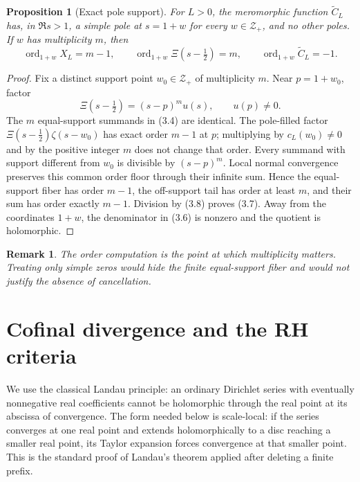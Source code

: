 \documentclass[11pt]{article}
\newtheorem{proposition}[theorem]{Proposition}
\newtheorem{remark}[theorem]{Remark}
\newcommand{\XiR}{\Xi}
\newcommand{\cZ}{\mathcal Z}
\newcommand{\ord}{\operatorname{ord}}
\begin{document}
\begin{proposition}[Exact pole support]\label{prop:poles}
For $L>0$, the meromorphic function $\widetilde C_L$ has, in $\Re s>1$, a simple pole at
$s=1+w$ for every $w\in\cZ_+$, and no other poles.  If $w$ has multiplicity $m$, then
\[
  \ord_{1+w}X_L=m-1,
  \qquad
  \ord_{1+w}\XiR(s-\tfrac12)=m,
  \qquad
  \ord_{1+w}\widetilde C_L=-1.
  \tag{3.7}
\]
\end{proposition}

\begin{proof}
Fix a distinct support point $w_0\in\cZ_+$ of multiplicity $m$.  Near $p=1+w_0$, factor
\[
  \XiR(s-\tfrac12)=(s-p)^m u(s),\qquad u(p)\ne0.
  \tag{3.8}
\]
The $m$ equal-support summands in (3.4) are identical.  The pole-filled factor
$\XiR(s-\frac12)\zeta(s-w_0)$ has exact order $m-1$ at $p$; multiplying by
$c_L(w_0)\ne0$ and by the positive integer $m$ does not change that order.  Every summand with
support different from $w_0$ is divisible by $(s-p)^m$.  Local normal convergence preserves this
common order floor through their infinite sum.  Hence the equal-support fiber has order $m-1$,
the off-support tail has order at least $m$, and their sum has order exactly $m-1$.  Division by
(3.8) proves (3.7).  Away from the coordinates $1+w$, the denominator in (3.6) is nonzero and the
quotient is holomorphic.
\end{proof}

\begin{remark}
The order computation is the point at which multiplicity matters.  Treating only simple zeros
would hide the finite equal-support fiber and would not justify the absence of cancellation.
\end{remark}

\section{Cofinal divergence and the RH criteria}

We use the classical Landau principle: an ordinary Dirichlet series with eventually nonnegative
real coefficients cannot be holomorphic through the real point at its abscissa of convergence.
The form needed below is scale-local: if the series converges at one real point and extends
holomorphically to a disc reaching a smaller real point, its Taylor expansion forces convergence
at that smaller point.  This is the standard proof of Landau's theorem applied after deleting a
finite prefix.
\end{document}
